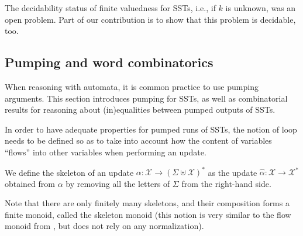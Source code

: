 \documentclass{article}
\providecommand{\AP}{}\NewDocumentCommand{\reintro}{o m}{#2}
\newcommand{\var}{\mathcal{X}}
\newcommand{\alp}{\Sigma}
\begin{document}
The decidability status of finite valuedness for SSTs, 
i.e., if $k$ is unknown, was an open problem.
Part of our contribution is to show that this problem is  decidable, too.





\subsection{Pumping and word combinatorics}\label{subsec:pumping}

When reasoning with automata, it is common practice
to use pumping arguments.
This section introduces pumping for SSTs, as well 
as combinatorial results for reasoning about (in)equalities 
between pumped outputs of SSTs.



In order to have adequate properties for pumped runs of SSTs,
the notion of loop needs to be defined so as to take into 
account how the content of variables ``flows'' into 
other variables when performing an update. 
\AP 
We define the skeleton of an update $\alpha: \var\rightarrow (\alp \uplus \var)^*$
as the update $\hat\alpha: \var \rightarrow \var^*$ obtained from $\alpha$
by removing all the letters of $\Sigma$ from the right-hand side.
\AP
Note that there are only finitely many skeletons, and 
their composition forms a finite monoid, called the
skeleton monoid
(this notion is very similar to the flow monoid from \cite{equivalence-finite-valued},
 but does not rely on any normalization).
\end{document}
